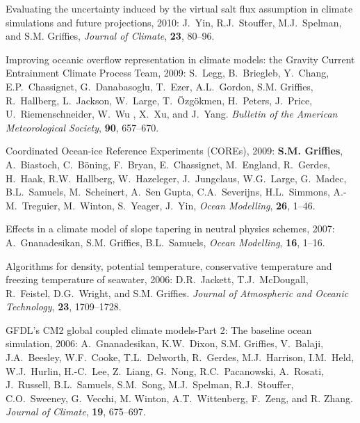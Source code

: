 \begin{etaremune}
\item Evaluating the uncertainty induced by the virtual salt flux assumption in climate simulations and future projections, 2010: J.\
  Yin, R.J.\ Stouffer, M.J.\ Spelman, and S.M. Grif\/f\/ies, {\em Journal of Climate}, {\bf 23}, 80--96.

\item Improving oceanic overflow representation in climate models: the   Gravity Current Entrainment Climate Process Team, 2009: S.\ Legg, B.\ Briegleb, Y.\ Chang, E.P.\ Chassignet, G.\ Danabasoglu, T.\
  Ezer, A.L.\ Gordon, S.M. Grif\/f\/ies, R.\ Hallberg, L.\ Jackson, W.\ Large, T.\ \"Ozg\"okmen, H.\ Peters, J.\ Price, U.\
  Riemenschneider, W.\ Wu , X.\ Xu, and J.\ Yang.  {\em Bulletin of the American Meteorological Society}, {\bf 90}, 657--670.

\item Coordinated Ocean-ice Reference Experiments (COREs), 2009: {\bf
    S.M. Grif\/f\/ies}, A.\ Biastoch, C.\ B\"{o}ning, F.\ Bryan, E.\
  Chassignet, M.\ England, R.\ Gerdes, H.\ Haak, R.W.\ Hallberg, W.\
  Hazeleger, J.\ Jungclaus, W.G.\ Large, G.\ Madec, B.L.\ Samuels, M.\
  Scheinert, A.\ Sen Gupta, C.A.\ Severijns, H.L.\ Simmons, A.-M.\
  Treguier, M.\ Winton, S.\ Yeager, J.\ Yin,  {\em Ocean Modelling},
  {\bf 26}, 1--46.  

\item Effects in a climate model of slope tapering in neutral physics
schemes, 2007: A.\ Gnanadesikan, S.M. Grif\/f\/ies, B.L.\
Samuels, {\em Ocean Modelling}, {\bf 16}, 1--16.
  
\item Algorithms for density, potential temperature, conservative
  temperature and freezing temperature of seawater, 2006: D.R.\
  Jackett, T.J.\ McDougall, R.\ Feistel, D.G.\ Wright, and S.M. Grif\/f\/ies.  {\em Journal of Atmospheric and Oceanic
    Technology}, {\bf 23}, 1709--1728.

\item GFDL's CM2 global coupled climate models-Part 2: The baseline
  ocean simulation, 2006: A.\ Gnanadesikan, K.W.\ Dixon, S.M. Grif\/f\/ies, V.\ Balaji, J.A.\ Beesley, W.F.\ Cooke, T.L.\ Delworth,
  R.\ Gerdes, M.J.\ Harrison, I.M.\ Held, W.J.\ Hurlin, H.-C.\ Lee,
  Z.\ Liang, G.\ Nong, R.C.\ Pacanowski, A.\ Rosati, J.\ Russell,
  B.L.\ Samuels, S.M.\ Song, M.J.\ Spelman, R.J.\ Stouffer, C.O.\
  Sweeney, G.\ Vecchi, M. Winton, A.T.\ Wittenberg, F.\ Zeng, and
  R. Zhang.  {\em Journal of Climate}, {\bf 19}, 675--697.


\end{etaremune}
